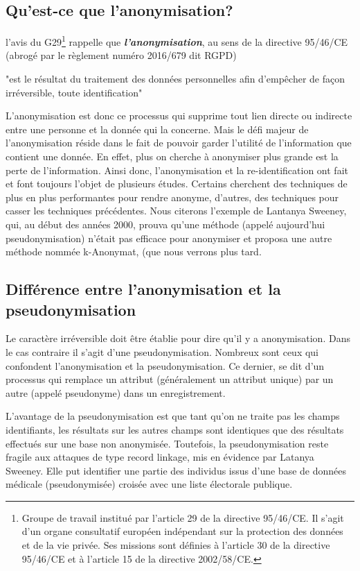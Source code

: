 \subsection{Qu'est-ce que l’anonymisation?} 

l’avis du G29\footnote{Groupe de travail institué par l’article 29 de la directive 95/46/CE. Il s’agit d’un organe consultatif européen indépendant
sur la protection des données et de la vie privée. Ses missions sont définies à l’article 30 de la directive 95/46/CE et à l’article
15 de la directive 2002/58/CE.} rappelle que \textbf{\emph{l’anonymisation}}, au sens de la directive 95/46/CE (abrogé par le règlement numéro 2016/679 dit \gls{RGPD})
\begin{em}
    "est le résultat du traitement des données personnelles afin d’empêcher de façon irréversible, toute identification"
\end{em}  

L’anonymisation est donc ce processus qui supprime tout lien directe ou indirecte entre une personne et la donnée qui la concerne. Mais le défi majeur de l’anonymisation réside dans le fait de pouvoir garder l’utilité de l’information que contient une donnée.  En effet, plus on cherche à anonymiser plus grande est la perte de l’information.  
Ainsi donc, l’anonymisation et la re-identification ont fait et font toujours l’objet de plusieurs études. Certains cherchent des techniques de plus en plus performantes pour rendre anonyme, d’autres, des techniques pour casser les techniques précédentes. Nous citerons l'exemple de Lantanya Sweeney, qui, au début des années 2000, prouva qu’une méthode (appelé aujourd’hui pseudonymisation) n’était pas efficace pour anonymiser et   proposa une autre méthode nommée k-Anonymat, (que nous verrons plus tard. 

\subsection{Différence entre l’anonymisation et la pseudonymisation}

Le caractère irréversible doit être établie pour dire qu’il y a anonymisation. Dans le cas contraire il s’agit d’une pseudonymisation. Nombreux sont ceux qui confondent l’anonymisation et la pseudonymisation. Ce dernier, se dit d’un processus qui remplace un attribut (généralement un attribut unique) par un autre (appelé pseudonyme) dans un enregistrement. 

L’avantage de la pseudonymisation est que tant qu’on ne traite pas les champs identifiants, les résultats sur les autres champs sont identiques que des résultats effectués sur une base non anonymisée. Toutefois, la pseudonymisation reste fragile aux attaques de type record linkage, mis en évidence par Latanya Sweeney. Elle put identifier une partie des individus issus d’une base de données médicale (pseudonymisée) croisée avec une liste électorale publique. 

